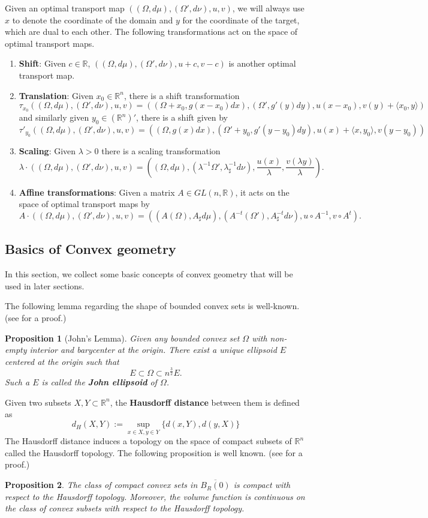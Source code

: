\documentclass[12pt,reqno]{amsart}
\newtheorem{prop}{Proposition}[section]
\numberwithin{equation}{section}
\begin{document}
Given an optimal transport map $((\Omega, d\mu), (\Omega', d\nu), u, v)$, we will always use $x$ to denote the coordinate of the domain and $y$ for the coordinate of the target, which are dual to each other. The following transformations act on the space of optimal transport maps. 
\begin{enumerate}
    \item {\bf Shift}: Given $c\in \mathbb R$, $((\Omega, d\mu), (\Omega', d\nu), u+c, v-c)$ is another optimal transport map. 
    \item {\bf Translation}: Given $x_0\in \mathbb R^n$, there is a shift transformation
    \[\tau_{x_0}((\Omega, d\mu), (\Omega', d\nu), u, v) = ((\Omega+x_0, g(x-x_0)dx), (\Omega', g'(y)dy), u(x-x_0), v(y)+\langle x_0, y\rangle)\]
    and similarly given $y_0\in (\mathbb R^n)'$, there is a shift given by
    \[\tau'_{y_0}((\Omega, d\mu), (\Omega', d\nu), u, v) = ((\Omega, g(x)dx), (\Omega'+y_0, g'(y-y_0)dy), u(x)+\langle x, y_0\rangle, v(y-y_0))\]
    \item {\bf Scaling}: Given $\lambda>0$ there is a scaling transformation
    \[\lambda\cdot ((\Omega, d\mu), (\Omega', d\nu), u, v) = ((\Omega, d\mu), (\lambda^{-1}\Omega', \lambda^{-1}_{\sharp}d\nu), \frac{u(x)}{\lambda}, \frac{v(\lambda y)}{\lambda}).\]
    \item {\bf Affine transformations}: Given a matrix $A\in GL(n, \mathbb R)$, it acts on the space of optimal transport maps by
    \[A\cdot ((\Omega, d\mu), (\Omega', d\nu), u, v) = ((A(\Omega), A_{\sharp}d\mu), (A^{-t}(\Omega'), A^{-t}_{\sharp}d\nu), u\circ A^{-1}, v\circ A^t). \]
\end{enumerate}

\subsection{Basics of Convex geometry}
In this section, we collect some basic concepts of convex geometry that will be used in later sections. 

The following lemma regarding the shape of bounded convex sets is well-known. (see \cite{Guetierrez} for a proof.)
\begin{prop}[John's Lemma]\label{prop: John's Lemma}
    Given any bounded convex set $\Omega$ with non-empty interior and barycenter at the origin. There exist a unique ellipsoid $E$ centered at the origin such that 
    \[E\subset \Omega\subset n^{\frac 3 2}E.\]
    Such a $E$ is called the {\bf John ellipsoid} of $\Omega$. 
\end{prop}
Given two subsets $X, Y\subset \mathbb R^n$, the {\bf Hausdorff distance} between them is defined as 
\[d_H(X, Y) := \sup_{x\in X, y\in Y} \{d(x, Y) , d(y, X)\}\]
The Hausdorff distance induces a topology on the space of compact subsets of $\mathbb R^n$ called the Hausdorff topology. The following proposition is well known. (see \cite{Schneider} for a proof.)
\begin{prop}
    The class of compact convex sets in $\overline{B_R(0)}$ is compact with respect to the Hausdorff topology. Moreover, the volume function is continuous on the class of convex subsets with respect to the Hausdorff topology. 
\end{prop}
\end{document}
